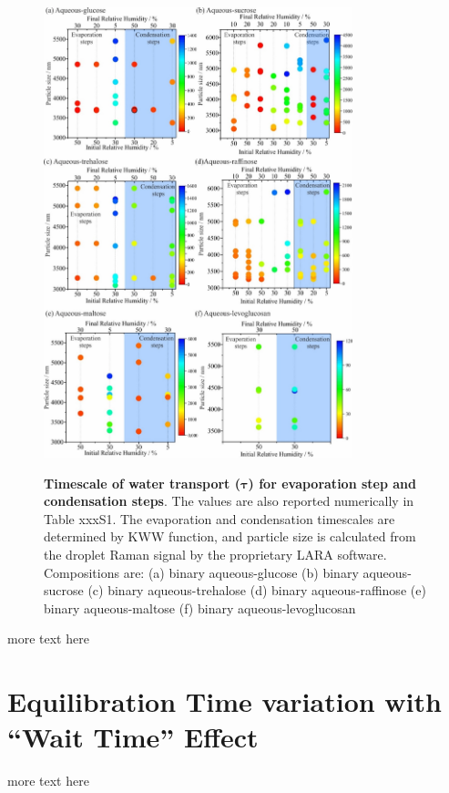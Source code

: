\begin{figure}
    \centering
    \caption{\textbf{Timescale of water transport ($\bm{\tau}$) for evaporation step and condensation steps}. The values are also reported numerically in Table xxxS1. The evaporation and condensation timescales are determined by KWW function, and particle size is calculated from the droplet Raman signal by the proprietary LARA software. Compositions are: (a) binary aqueous-glucose (b) binary aqueous-sucrose (c) binary aqueous-trehalose (d) binary aqueous-raffinose (e) binary aqueous-maltose (f) binary aqueous-levoglucosan}
    \includegraphics[width=0.8\textwidth]{chapters/water_hopping/figures/image005.jpg}
    \label{fig:wat_s3}
\end{figure}

more text here

\section{Equilibration Time variation with ``Wait Time'' Effect}
 
more text here


